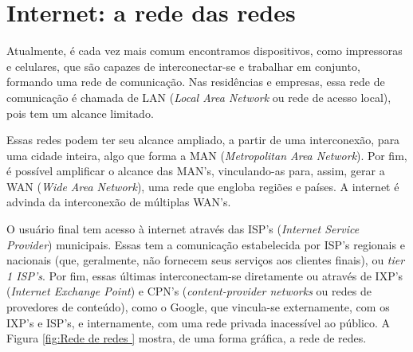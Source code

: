 





\hypertarget{internet-a-rede-das-redes}{%
\chapter{Internet: a rede das
redes}\label{internet-a-rede-das-redes}}

Atualmente, é cada vez mais comum encontramos dispositivos, como
impressoras e celulares, que são capazes de interconectar-se e trabalhar
em conjunto, formando uma rede de comunicação. Nas residências e
empresas, essa rede de comunicação é chamada de LAN (\emph{Local Area
Network} ou rede de acesso local), pois tem um alcance limitado.

Essas redes podem ter seu alcance ampliado, a partir de uma
interconexão, para uma cidade inteira, algo que forma a MAN
(\emph{Metropolitan Area Network}). Por fim, é possível amplificar o
alcance das MAN's, vinculando-as para, assim, gerar a WAN (\emph{Wide
Area Network}), uma rede que engloba regiões e países. A internet é
advinda da interconexão de múltiplas WAN's.

O usuário final tem acesso à internet através das ISP's (\emph{Internet
Service Provider}) municipais. Essas tem a comunicação estabelecida por
ISP's regionais e nacionais (que, geralmente, não fornecem seus serviços
aos clientes finais), ou \emph{tier 1 ISP's}. Por fim, essas últimas
interconectam-se diretamente ou através de IXP's (\emph{Internet
Exchange Point}) e CPN's (\emph{content-provider networks} ou redes de
provedores de conteúdo), como o Google, que vincula-se externamente, com
os IXP's e ISP's, e internamente, com uma rede privada inacessível ao
público. A Figura \ref{fig:Rede de redes } mostra, de uma forma gráfica, a rede de redes.

